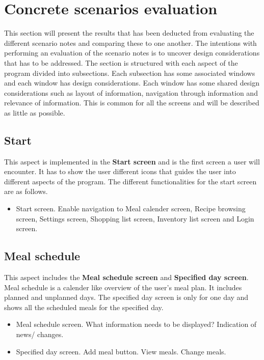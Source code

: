 \section{Concrete scenarios evaluation}
This section will present the results that has been deducted from evaluating the different scenario notes and comparing these to one another. The intentions with performing an evaluation of the scenario notes is to uncover design considerations that has to be addressed. The section is structured with each aspect of the program divided into subsections. Each subsection has some associated windows and each window has design considerations. Each window has some shared design considerations such as layout of information, navigation through information and relevance of information. This is common for all the screens and will be described as little as possible.

\subsection{Start}
This aspect is implemented in the \textbf{Start screen} and is the first screen a user will encounter. It has to show the user different icons that guides the user into different aspects of the program. The different functionalities for the start screen are as follows.

\begin{itemize}
	\item Start screen.	
		\subitem Enable navigation to Meal calender screen, Recipe browsing screen, Settings screen, 				Shopping list screen, Inventory list screen and Login screen.
\end{itemize}

\subsection{Meal schedule}
This aspect includes the \textbf{Meal schedule screen} and \textbf{Specified day screen}. Meal schedule is a calender like overview of the user's meal plan. It includes planned and unplanned days. The specified day screen is only for one day and shows all the scheduled meals for the specified day.

\begin{itemize}
	\item Meal schedule screen.
		\subitem What information needs to be displayed? 
		\subitem Indication of news/ changes.
	\item Specified day screen.
		\subitem Add meal button.
		\subitem View meals.
		\subitem Change meals.
\end{itemize}

